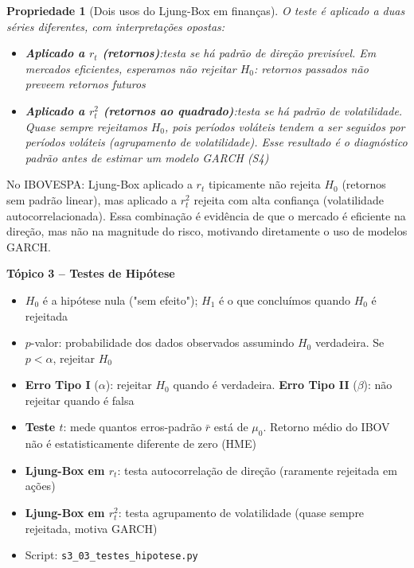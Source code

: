 \documentclass[11pt,a4paper]{article}
\newcommand{\code}[1]{%
  \colorbox{quantlightgray}{\texttt{\small\color{quantdark}#1}}%
}
\theoremstyle{quant}
\newtheorem{propriedade}{Propriedade}[section]
\begin{document}
\begin{propriedade}[Dois usos do Ljung-Box em finanças]
O teste é aplicado a duas séries diferentes, com interpretações opostas:
\begin{itemize}
  \item \textbf{Aplicado a $r_t$ (retornos)}:\quad testa se há padrão de direção
        previsível. Em mercados eficientes, esperamos \emph{não rejeitar} $H_0$:
        retornos passados não preveem retornos futuros

  \item \textbf{Aplicado a $r_t^2$ (retornos ao quadrado)}:\quad testa se há padrão
        de \emph{volatilidade}. Quase sempre \emph{rejeitamos} $H_0$, pois períodos
        voláteis tendem a ser seguidos por períodos voláteis (agrupamento de volatilidade).
        Esse resultado é o diagnóstico padrão antes de estimar um modelo GARCH (S4)
\end{itemize}
\end{propriedade}

\begin{caixainsight}
No IBOVESPA: Ljung-Box aplicado a $r_t$ tipicamente não rejeita $H_0$ (retornos
sem padrão linear), mas aplicado a $r_t^2$ rejeita com alta confiança (volatilidade
autocorrelacionada). Essa combinação é evidência de que o mercado é eficiente na
direção, mas não na magnitude do risco, motivando diretamente o uso de modelos GARCH.
\end{caixainsight}

\begin{caixaresumo}
\textbf{Tópico 3 -- Testes de Hipótese}
\begin{itemize}
  \item $H_0$ é a hipótese nula ("sem efeito"); $H_1$ é o que concluímos quando $H_0$ é rejeitada
  \item $p$-valor: probabilidade dos dados observados assumindo $H_0$ verdadeira. Se $p < \alpha$, rejeitar $H_0$
  \item \textbf{Erro Tipo I} ($\alpha$): rejeitar $H_0$ quando é verdadeira. \textbf{Erro Tipo II} ($\beta$): não rejeitar quando é falsa
  \item \textbf{Teste $t$}: mede quantos erros-padrão $\bar{r}$ está de $\mu_0$. Retorno médio do IBOV não é estatisticamente diferente de zero (HME)
  \item \textbf{Ljung-Box em $r_t$}: testa autocorrelação de direção (raramente rejeitada em ações)
  \item \textbf{Ljung-Box em $r_t^2$}: testa agrupamento de volatilidade (quase sempre rejeitada, motiva GARCH)
  \item Script: \code{s3\_03\_testes\_hipotese.py}
\end{itemize}
\end{caixaresumo}
\end{document}
